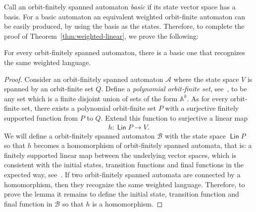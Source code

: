 \documentclass{theoretics}
\newcommand{\Aa}{{\mathcal A}}
\newcommand{\Bb}{{\mathcal B}}
\newcommand{\atoms}{\mathbb A}
\DeclareMathOperator{\lin}{\mathsf{Lin}}
\begin{document}
Call an orbit-finitely spanned automaton {\em basic} if its state vector space has a basis.
For a basic automaton an equivalent weighted orbit-finite automaton can be easily produced, by using the basis as the states.  Therefore, to complete the proof of Theorem~\ref{thm:weighted-linear}, we prove the following:
\begin{lemma}\label{lem:basic-recognize-same-languages}
    For every orbit-finitely spanned automaton, there is a basic one that  recognizes the same weighted language.
\end{lemma}
\begin{proof}
    Consider an orbit-finitely spanned automaton $\Aa$ where the state space $V$ is spanned by an  orbit-finite set $Q$. Define a \emph{polynomial orbit-finite  set}, see~\cite[Definition 1]{bojanczykSingleUseRegister2019},  to be any set which is  a finite disjoint union of sets of the form $\atoms^k$.  As for every orbit-finite set, there exists a  polynomial orbit-finite set $P$ with a surjective finitely supported function from $P$ to $Q$.
    Extend this function  to surjective a linear map
    \begin{align*}
    h : \lin P \to V.
    \end{align*}
     We will define a orbit-finitely spanned automaton $\Bb$ with the state space $\lin P$ so that $h$ becomes a homomorphism  of orbit-finitely spanned automata, that is: a finitely supported linear map between the underlying vector spaces, which is consistent with the initial states, transition functions and final functions in the expected way, see~\cite[Sec.~6.2]{bojanczyk_slightly2018}. If two orbit-finitely spanned automata are connected by a homomorphism, then they recognize the same weighted language.
     Therefore, to prove the lemma it remains to define the initial state, transition function and final function in $\Bb$ so that $h$ is a homomorphism.


\end{proof}
\end{document}
